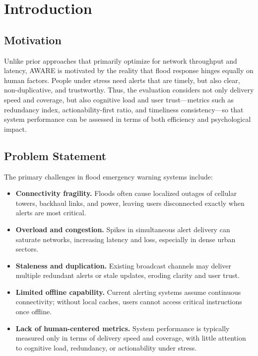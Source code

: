 
\section{Introduction}

\subsection{Motivation}

Unlike prior approaches that primarily optimize for network throughput and latency, AWARE is motivated by the reality that flood response hinges equally on human factors. People under stress need alerts that are timely, but also clear, non-duplicative, and trustworthy. Thus, the evaluation considers not only delivery speed and coverage, but also cognitive load and user trust---metrics such as redundancy index, actionability-first ratio, and timeliness consistency---so that system performance can be assessed in terms of both efficiency and psychological impact.

\subsection{Problem Statement}
The primary challenges in flood emergency warning systems include:

\begin{itemize}
    \item \textbf{Connectivity fragility.} Floods often cause localized outages of cellular towers, backhaul links, and power, leaving users disconnected exactly when alerts are most critical.
    \item \textbf{Overload and congestion.} Spikes in simultaneous alert delivery can saturate networks, increasing latency and loss, especially in dense urban sectors.
    \item \textbf{Staleness and duplication.} Existing broadcast channels may deliver multiple redundant alerts or stale updates, eroding clarity and user trust.
    \item \textbf{Limited offline capability.} Current alerting systems assume continuous connectivity; without local caches, users cannot access critical instructions once offline.
    \item \textbf{Lack of human-centered metrics.} System performance is typically measured only in terms of delivery speed and coverage, with little attention to cognitive load, redundancy, or actionability under stress.
\end{itemize}

